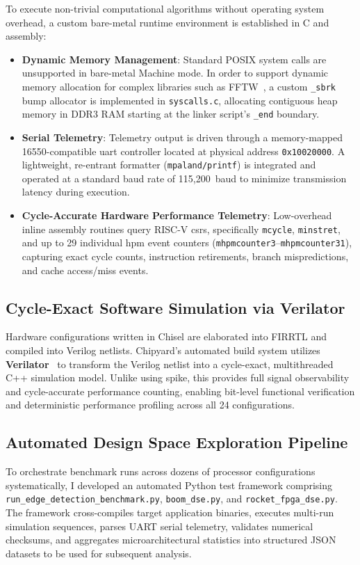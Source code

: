To execute non-trivial computational algorithms without operating system overhead, a custom bare-metal runtime environment is established in C and assembly:

\begin{itemize}
    \item \textbf{Dynamic Memory Management}: Standard POSIX system calls are unsupported in bare-metal Machine mode. 
      In order to support dynamic memory allocation for complex libraries such as FFTW~\cite{frigo2005design}, a custom \texttt{\_sbrk} bump allocator is implemented in \texttt{syscalls.c}, 
      allocating contiguous heap memory in DDR3 RAM starting at the linker script's \texttt{\_end} boundary.
    \item \textbf{Serial Telemetry}: Telemetry output is driven through a memory-mapped 16550-compatible \gls{uart} controller located at physical address \texttt{0x10020000}. 
      A lightweight, re-entrant formatter (\texttt{mpaland/printf}) is integrated and operated at a standard baud rate of 115,200~baud to minimize transmission latency during execution.
    \item \textbf{Cycle-Accurate Hardware Performance Telemetry}: Low-overhead inline assembly routines query RISC-V \glspl{csr}, specifically \texttt{mcycle}, \texttt{minstret}, 
      and up to 29 individual \gls{hpm} event counters (\texttt{mhpmcounter3}--\texttt{mhpmcounter31}), capturing exact cycle counts, instruction retirements, branch mispredictions, 
      and cache access/miss events.
\end{itemize}

\subsection{Cycle-Exact Software Simulation via Verilator}
Hardware configurations written in Chisel are elaborated into FIRRTL and compiled into Verilog netlists. 
Chipyard's automated build system utilizes \textbf{Verilator}~\cite{snyder2004verilator} to transform the Verilog netlist into a cycle-exact, multithreaded C++ simulation model. 
Unlike using spike, this provides full signal observability and cycle-accurate performance counting, enabling bit-level functional verification 
and deterministic performance profiling across all 24 configurations.

\subsection{Automated Design Space Exploration Pipeline}
To orchestrate benchmark runs across dozens of processor configurations systematically, 
I developed an automated Python test framework comprising \texttt{run\_\allowbreak edge\_\allowbreak detection\_\allowbreak benchmark.py}, \texttt{boom\_dse.py}, and \texttt{rocket\_fpga\_dse.py}.
The framework cross-compiles target application binaries, 
executes multi-run simulation sequences, parses UART serial telemetry, validates numerical checksums, 
and aggregates microarchitectural statistics into structured JSON datasets to be used for subsequent analysis.


